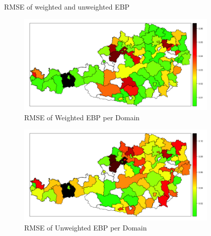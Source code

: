 \documentclass[fleqn,final]{beamer}
\newcommand{\Pheight}{\rule[-5mm]{0cm}{1cm}}
\begin{document}
\begin{frame}
\begin{columns}[t]
\begin{column}{.3\linewidth}
\begin{block}{RMSE of weighted and unweighted EBP\Pheight}
\begin{center}
	\begin{figure}
		\includegraphics[width=0.9\textwidth]{EBPWeightedRMSE}
		\caption{RMSE of Weighted EBP per Domain}
	\end{figure}
		\begin{figure}
		\includegraphics[width=0.9\textwidth]{EBPUnweightedRMSE}
		\caption{RMSE of Unweighted EBP per Domain}
	\end{figure}
\end{center}

\end{block}

\end{column}

%

\begin{column}{.3\linewidth}


\end{column}
\end{columns}
\end{frame}
\end{document}
